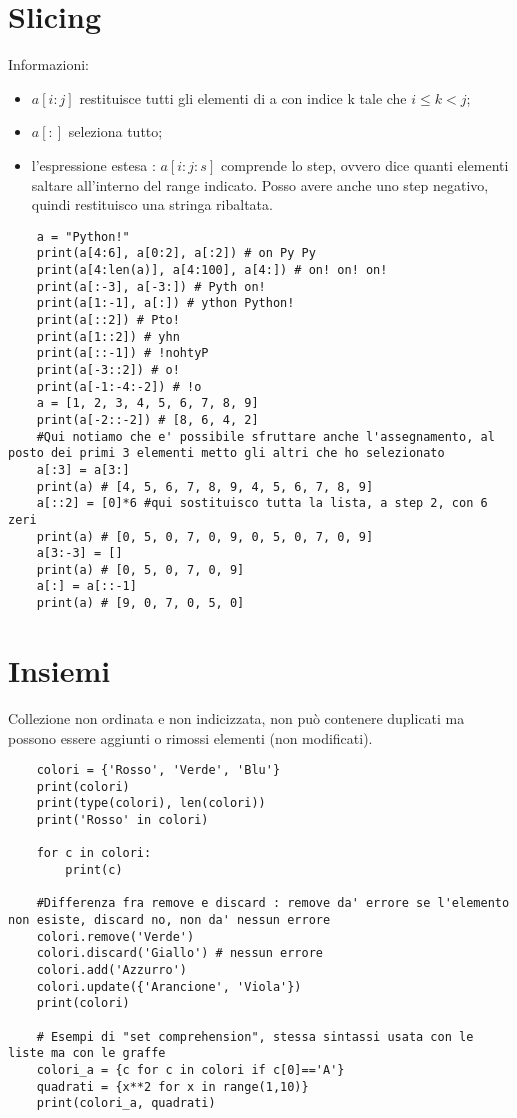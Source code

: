 \newpage

\section{Slicing}

Informazioni:
\begin{itemize}
	\item $a[i:j]$ restituisce tutti gli elementi di a con indice k tale che $i \leq k < j$;
	\item $a[:]$ seleziona tutto;
	\item l'espressione estesa : $a[i:j:s]$ comprende lo step, ovvero dice quanti elementi saltare all'interno del range indicato. Posso avere anche uno step negativo, quindi restituisco una stringa ribaltata.
\end{itemize}

\begin{lstlisting}
	a = "Python!"
	print(a[4:6], a[0:2], a[:2]) # on Py Py
	print(a[4:len(a)], a[4:100], a[4:]) # on! on! on!
	print(a[:-3], a[-3:]) # Pyth on!
	print(a[1:-1], a[:]) # ython Python!
	print(a[::2]) # Pto!
	print(a[1::2]) # yhn
	print(a[::-1]) # !nohtyP
	print(a[-3::2]) # o!
	print(a[-1:-4:-2]) # !o
	a = [1, 2, 3, 4, 5, 6, 7, 8, 9]
	print(a[-2::-2]) # [8, 6, 4, 2]
	#Qui notiamo che e' possibile sfruttare anche l'assegnamento, al posto dei primi 3 elementi metto gli altri che ho selezionato
	a[:3] = a[3:]
	print(a) # [4, 5, 6, 7, 8, 9, 4, 5, 6, 7, 8, 9]
	a[::2] = [0]*6 #qui sostituisco tutta la lista, a step 2, con 6 zeri
	print(a) # [0, 5, 0, 7, 0, 9, 0, 5, 0, 7, 0, 9]
	a[3:-3] = []
	print(a) # [0, 5, 0, 7, 0, 9]
	a[:] = a[::-1]
	print(a) # [9, 0, 7, 0, 5, 0]
\end{lstlisting}

\newpage

\section{Insiemi}

Collezione non ordinata e non indicizzata, non può contenere duplicati ma possono essere aggiunti o rimossi elementi (non modificati).

\begin{lstlisting}
	colori = {'Rosso', 'Verde', 'Blu'}
	print(colori)
	print(type(colori), len(colori))
	print('Rosso' in colori)
	
	for c in colori:
		print(c)
		
	#Differenza fra remove e discard : remove da' errore se l'elemento non esiste, discard no, non da' nessun errore
	colori.remove('Verde')
	colori.discard('Giallo') # nessun errore
	colori.add('Azzurro')
	colori.update({'Arancione', 'Viola'})
	print(colori)
	
	# Esempi di "set comprehension", stessa sintassi usata con le liste ma con le graffe
	colori_a = {c for c in colori if c[0]=='A'}
	quadrati = {x**2 for x in range(1,10)}
	print(colori_a, quadrati)
\end{lstlisting}

